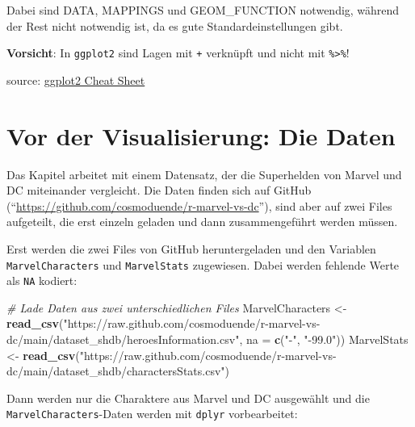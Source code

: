 \documentclass[
  ngerman,
]{book}
\newenvironment{Shaded}{\begin{snugshade}}{\end{snugshade}}
\newcommand{\AttributeTok}[1]{\textcolor[rgb]{0.13,0.29,0.53}{#1}}
\newcommand{\CommentTok}[1]{\textcolor[rgb]{0.56,0.35,0.01}{\textit{#1}}}
\newcommand{\FunctionTok}[1]{\textcolor[rgb]{0.13,0.29,0.53}{\textbf{#1}}}
\newcommand{\NormalTok}[1]{#1}
\newcommand{\OtherTok}[1]{\textcolor[rgb]{0.56,0.35,0.01}{#1}}
\newcommand{\StringTok}[1]{\textcolor[rgb]{0.31,0.60,0.02}{#1}}
\begin{document}
Dabei sind {DATA}, {MAPPINGS} und {GEOM\_FUNCTION} notwendig, während {der Rest} nicht notwendig ist, da es gute Standardeinstellungen gibt.

\textbf{Vorsicht}: In \texttt{ggplot2} sind Lagen mit \texttt{+} verknüpft und nicht mit \texttt{\%\textgreater{}\%}!

source: \href{https://www.rstudio.com/resources/cheatsheets/}{ggplot2 Cheat Sheet}

\section{Vor der Visualisierung: Die Daten}\label{vor-der-visualisierung-die-daten}

Das Kapitel arbeitet mit einem Datensatz, der die Superhelden von Marvel und DC miteinander vergleicht. Die Daten finden sich auf GitHub (``\url{https://github.com/cosmoduende/r-marvel-vs-dc}''), sind aber auf zwei Files aufgeteilt, die erst einzeln geladen und dann zusammengeführt werden müssen.

Erst werden die zwei Files von GitHub heruntergeladen und den Variablen \texttt{MarvelCharacters} und \texttt{MarvelStats} zugewiesen. Dabei werden fehlende Werte als \texttt{NA} kodiert:

\begin{Shaded}
\begin{Highlighting}[]
\CommentTok{\# Lade Daten aus zwei unterschiedlichen Files}
\NormalTok{MarvelCharacters }\OtherTok{\textless{}{-}} \FunctionTok{read\_csv}\NormalTok{(}\StringTok{"https://raw.github.com/cosmoduende/r{-}marvel{-}vs{-}dc/main/dataset\_shdb/heroesInformation.csv"}\NormalTok{, }
                             \AttributeTok{na =} \FunctionTok{c}\NormalTok{(}\StringTok{"{-}"}\NormalTok{, }\StringTok{"{-}99.0"}\NormalTok{))}
\NormalTok{MarvelStats }\OtherTok{\textless{}{-}} \FunctionTok{read\_csv}\NormalTok{(}\StringTok{"https://raw.github.com/cosmoduende/r{-}marvel{-}vs{-}dc/main/dataset\_shdb/charactersStats.csv"}\NormalTok{)}
\end{Highlighting}
\end{Shaded}

Dann werden nur die Charaktere aus Marvel und DC ausgewählt und die \texttt{MarvelCharacters}-Daten werden mit \texttt{dplyr} vorbearbeitet:
\end{document}
